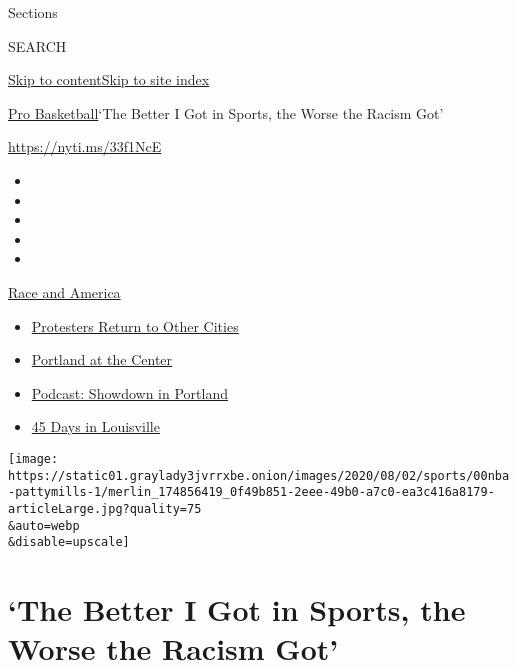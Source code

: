 Sections

SEARCH

\protect\hyperlink{site-content}{Skip to
content}\protect\hyperlink{site-index}{Skip to site index}

\href{/section/sports/basketball}{Pro Basketball}\textbar{}`The Better I
Got in Sports, the Worse the Racism Got'

\url{https://nyti.ms/33f1NcE}

\begin{itemize}
\item
\item
\item
\item
\item
\end{itemize}

\href{https://www.nytimes3xbfgragh.onion/news-event/george-floyd-protests-minneapolis-new-york-los-angeles?action=click\&pgtype=Article\&state=default\&region=TOP_BANNER\&context=storylines_menu}{Race
and America}

\begin{itemize}
\tightlist
\item
  \href{https://www.nytimes3xbfgragh.onion/2020/07/26/us/protests-portland-seattle-trump.html?action=click\&pgtype=Article\&state=default\&region=TOP_BANNER\&context=storylines_menu}{Protesters
  Return to Other Cities}
\item
  \href{https://www.nytimes3xbfgragh.onion/2020/07/24/us/portland-oregon-protests-white-race.html?action=click\&pgtype=Article\&state=default\&region=TOP_BANNER\&context=storylines_menu}{Portland
  at the Center}
\item
  \href{https://www.nytimes3xbfgragh.onion/2020/07/23/podcasts/the-daily/portland-protests.html?action=click\&pgtype=Article\&state=default\&region=TOP_BANNER\&context=storylines_menu}{Podcast:
  Showdown in Portland}
\item
  \href{https://www.nytimes3xbfgragh.onion/interactive/2020/07/16/us/black-lives-matter-protests-louisville-breonna-taylor.html?action=click\&pgtype=Article\&state=default\&region=TOP_BANNER\&context=storylines_menu}{45
  Days in Louisville}
\end{itemize}

\texttt{[image: https://static01.graylady3jvrrxbe.onion/images/2020/08/02/sports/00nba-pattymills-1/merlin\_174856419\_0f49b851-2eee-49b0-a7c0-ea3c416a8179-articleLarge.jpg?quality=75\\\&auto=webp\\\&disable=upscale]}

\hypertarget{the-better-i-got-in-sports-the-worse-the-racism-got}{%
\section{`The Better I Got in Sports, the Worse the Racism
Got'}\label{the-better-i-got-in-sports-the-worse-the-racism-got}}

